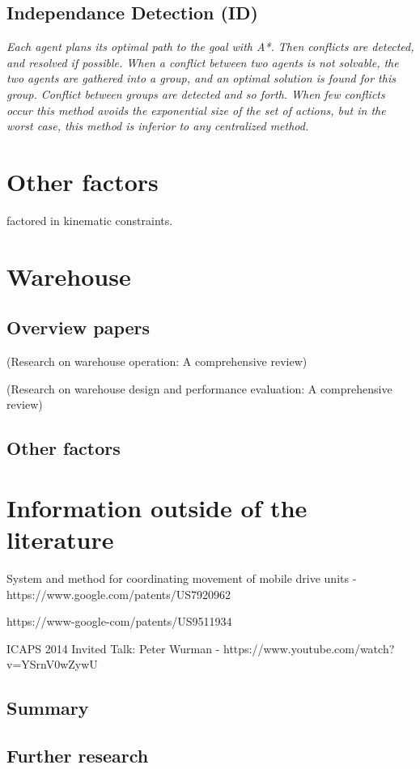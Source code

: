 \documentclass[a4paper,11pt]{article}
\begin{document}
\subsection{Independance Detection (ID)}
\textit{Each agent plans its optimal path to the goal with A*. Then conflicts are detected, and resolved if possible. When a conflict between two agents is not solvable, the two agents are gathered into a group, and an optimal solution is found for this group. Conflict between groups are detected and so forth. When few conflicts occur this method avoids the exponential size of the set of actions, but in the worst case, this method is inferior to any centralized method.}


\section{Other factors}
\cite{honig2016multi} factored in kinematic constraints.

\section{Warehouse}

\subsection{Overview papers}
\cite{gu2007research} (Research on warehouse operation: A comprehensive review)

\cite{gu2010research} (Research on warehouse design and performance evaluation: A comprehensive review)

\subsection{Other factors}
\cite{correll2016lessons}


\section{Information outside of the literature}
System and method for coordinating movement of mobile drive units  - https://www.google.com/patents/US7920962

https://www-google-com/patents/US9511934

ICAPS 2014 Invited Talk: Peter Wurman - https://www.youtube.com/watch?v=YSrnV0wZywU

\subsection{Summary}


\subsection{Further research}




\end{document}
